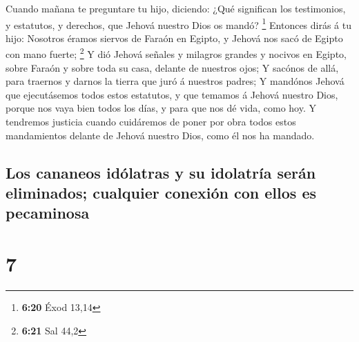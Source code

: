  Cuando mañana te preguntare tu hijo, diciendo: ¿Qué
significan los testimonios, y estatutos, y derechos, que Jehová nuestro
Dios os mandó? \footnote{\textbf{6:20} Éxod 13,14} 
Entonces dirás á tu hijo: Nosotros éramos siervos de Faraón en Egipto, y
Jehová nos sacó de Egipto con mano fuerte; \footnote{\textbf{6:21} Sal
  44,2}  Y dió Jehová señales y milagros grandes y nocivos
en Egipto, sobre Faraón y sobre toda su casa, delante de nuestros ojos;
 Y sacónos de allá, para traernos y darnos la tierra que
juró á nuestros padres;  Y mandónos Jehová que ejecutásemos
todos estos estatutos, y que temamos á Jehová nuestro Dios, porque nos
vaya bien todos los días, y para que nos dé vida, como hoy.
 Y tendremos justicia cuando cuidáremos de poner por obra
todos estos mandamientos delante de Jehová nuestro Dios, como él nos ha
mandado.

\hypertarget{los-cananeos-iduxf3latras-y-su-idolatruxeda-seruxe1n-eliminados-cualquier-conexiuxf3n-con-ellos-es-pecaminosa}{%
\subsection{Los cananeos idólatras y su idolatría serán eliminados;
cualquier conexión con ellos es
pecaminosa}\label{los-cananeos-iduxf3latras-y-su-idolatruxeda-seruxe1n-eliminados-cualquier-conexiuxf3n-con-ellos-es-pecaminosa}}

\hypertarget{section-6}{%
\section{7}\label{section-6}}

